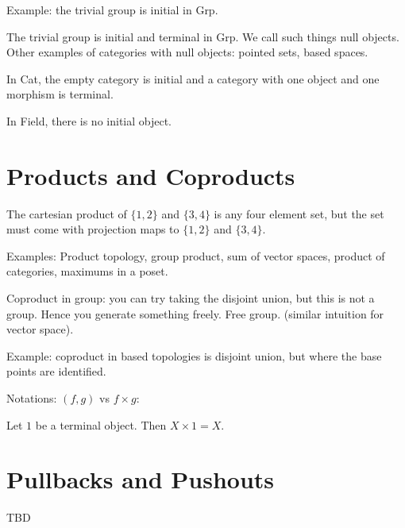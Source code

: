 \documentclass{article}
\begin{document}
Example: the trivial group is initial in Grp.

The trivial group is initial and terminal in Grp. We call such things null objects. Other examples of categories with null objects: pointed sets, based spaces.

In Cat, the empty category is initial and a category with one object and one morphism is terminal.

In Field, there is no initial object.

\section{Products and Coproducts}

The cartesian product of $\{1, 2\}$ and $\{3, 4\}$ is any four element set, but the set must come with projection maps to $\{1, 2\}$ and $\{3, 4\}$.

Examples: Product topology, group product, sum of vector spaces, product of categories, maximums in a poset.

Coproduct in group: you can try taking the disjoint union, but this is not a group. Hence you generate something freely. Free group. (similar intuition for vector space).

Example: coproduct in based topologies is disjoint union, but where the base points are identified.

Notations: $(f, g)$ vs $f \times g$:





Let $1$ be a terminal object. Then $X \times 1 = X$.

\section{Pullbacks and Pushouts}

TBD
\end{document}
